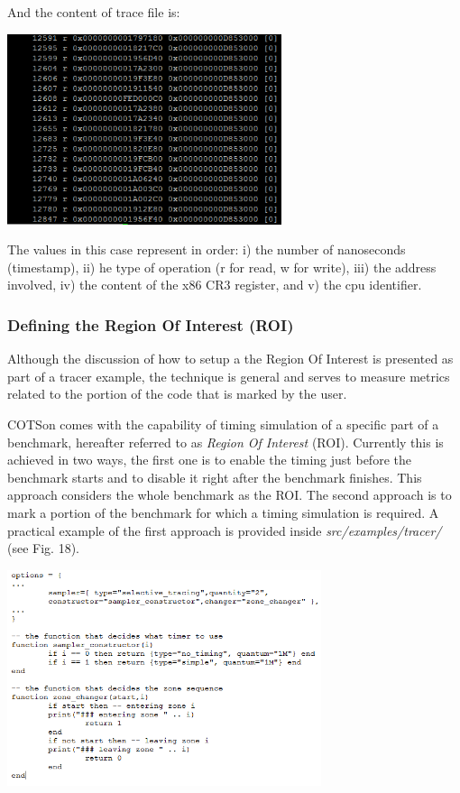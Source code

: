\documentclass[a4paper]{article}
\begin{document}
{
And the content of trace file is:}

{\centering 
\includegraphics[width=3.172in,height=2.1992in]{img33.png}
\par}

{
The values in this case represent in order: i) the number of nanoseconds
(timestamp), ii) he type of operation (r for read, w for write), iii)
the address involved, iv) the content of the x86 CR3 register, and v)
the cpu identifier.}

\subsubsection[Defining the Region Of Interest
(ROI)]{\foreignlanguage{english}{\textrm{Defining the Region Of
Interest (ROI)}}}
{
Although the discussion of how to setup a the Region Of Interest is
presented as part of a tracer example, the technique is general and
serves to measure metrics related to the portion of the code that is
marked by the user.}

{\ttfamily
\textrm{COTSon comes with the capability of timing simulation of a
specific part of a benchmark, hereafter referred to as
}\textrm{\textit{Region Of Interest}}\textrm{ (ROI). Currently this is
achieved in two ways, the first one is to enable the timing just before
the benchmark starts and to disable it right after the benchmark
finishes. This approach considers the whole benchmark as the ROI. The
second approach is to mark a portion of the benchmark for which a
timing simulation is required. A practical example of the first
approach is provided inside }\textrm{\textit{src/examples/tracer/
}}\textrm{(see }\textrm{Fig. 18}\textrm{).}}

{\centering 
\includegraphics[width=3.6264in,height=2.4862in]{img34.png}
\par}
\end{document}
